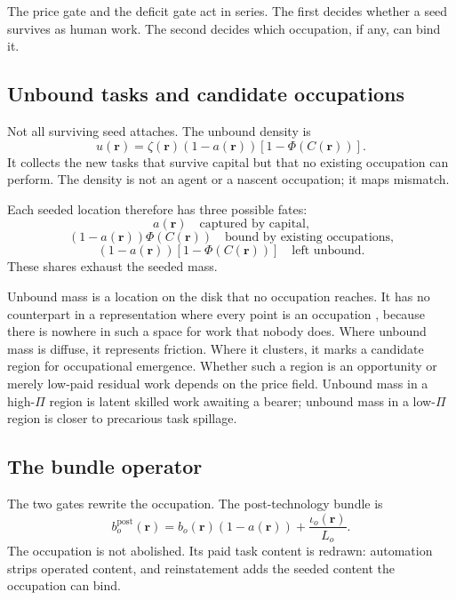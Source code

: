 \documentclass[12pt, a4paper]{article}
\begin{document}
The price gate and the deficit gate act in series. The first decides
whether a seed survives as human work. The second decides which
occupation, if any, can bind it.

\subsection{Unbound tasks and candidate occupations}
\label{sec:unbound}

Not all surviving seed attaches. The unbound density is
\begin{equation}
  u(\mathbf{r})
  =
  \zeta(\mathbf{r})
  (1-a(\mathbf{r}))
  [1-\Phi(C(\mathbf{r}))].
  \label{eq:unbound}
\end{equation}
It collects the new tasks that survive capital but that no existing
occupation can perform. The density is not an agent or a nascent
occupation; it maps mismatch.

Each seeded location therefore has three possible fates:
\[
  a(\mathbf{r}) \quad \text{captured by capital,}
\]
\[
  (1-a(\mathbf{r}))\Phi(C(\mathbf{r}))
  \quad \text{bound by existing occupations,}
\]
\[
  (1-a(\mathbf{r}))[1-\Phi(C(\mathbf{r}))]
  \quad \text{left unbound.}
\]
These shares exhaust the seeded mass.

Unbound mass is a location on the disk that no occupation reaches. It
has no counterpart in a representation where every point is an
occupation \parencite{yamaguchi2012, neffke2013, alabdulkareem2018},
because there is nowhere in such a space for work that nobody does.
Where unbound mass is diffuse, it represents friction. Where it
clusters, it marks a candidate region for occupational emergence.
Whether such a region is an opportunity or merely low-paid residual work
depends on the price field. Unbound mass in a high-$\Pi$ region is
latent skilled work awaiting a bearer; unbound mass in a low-$\Pi$
region is closer to precarious task spillage.

\subsection{The bundle operator}
\label{sec:bundle-operator}

The two gates rewrite the occupation. The post-technology bundle is
\begin{equation}
  b_o^{\text{post}}(\mathbf{r})
  =
  b_o(\mathbf{r})(1-a(\mathbf{r}))
  +
  \frac{\iota_o(\mathbf{r})}{L_o}.
  \label{eq:bundle-operator}
\end{equation}
The occupation is not abolished. Its paid task content is redrawn:
automation strips operated content, and reinstatement adds the seeded
content the occupation can bind.
\end{document}
